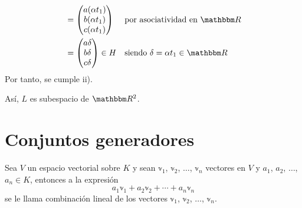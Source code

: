 \begin{example}
\begin{enumerate}[label=\roman*)]
\begin{align*}
            & = \begin{pmatrix} a (\alpha t_1) \\ b (\alpha t_1) \\ c (\alpha t_1) \end{pmatrix} && \text{por asociatividad en $\RR$} \\
            & = \begin{pmatrix} a\delta \\ b\delta \\ c\delta \end{pmatrix} \in H  && \text{siendo $\delta = \alpha t_1 \in \RR$}
        \end{align*}
        Por tanto, se cumple ii).
    \end{enumerate}
    Así, $L$ es subespacio de $\RR[2]$.
\end{example}

\section{Conjuntos generadores}

\begin{definition}
    Sea $V$ un espacio vectorial sobre $K$ y sean $\mathbb{v}_1$, $\mathbb{v}_2$, $\dots$, $\mathbb{v}_n$ vectores en $V$ y $a_1$, $a_2$, $\dots$, $a_n \in K$, entonces a la expresión
    $$a_1 \mathbb{v}_1 + a_2 \mathbb{v}_2 + \cdots + a_n \mathbb{v}_n$$
    se le llama combinación lineal de los vectores $\mathbb{v}_1$, $\mathbb{v}_2$, $\dots$, $\mathbb{v}_n$.
\end{definition}

